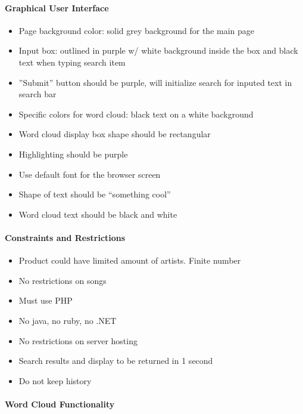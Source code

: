 \documentclass[]{article}
\begin{document}
\paragraph{Graphical User Interface}\label{graphical-user-interface}

\begin{itemize}
\itemsep1pt\parskip0pt
\item
  Page background color: solid grey background for the main page
\item
  Input box: outlined in purple w/ white background inside the box and
  black text when typing search item
\item
  ''Submit'' button should be purple, will initialize search for inputed
  text in search bar
\item
  Specific colors for word cloud: black text on a white background
\item
  Word cloud display box shape should be rectangular
\item
  Highlighting should be purple
\item
  Use default font for the browser screen
\item
  Shape of text should be ``something cool''
\item
  Word cloud text should be black and white
\end{itemize}

\paragraph{Constraints and
Restrictions}\label{constraints-and-restrictions}

\begin{itemize}
\itemsep1pt\parskip0pt
\item
  Product could have limited amount of artists. Finite number
\item
  No restrictions on songs
\item
  Must use PHP
\item
  No java, no ruby, no .NET
\item
  No restrictions on server hosting
\item
  Search results and display to be returned in 1 second
\item
  Do not keep history
\end{itemize}

\paragraph{Word Cloud Functionality}\label{word-cloud-functionality}
\end{document}
